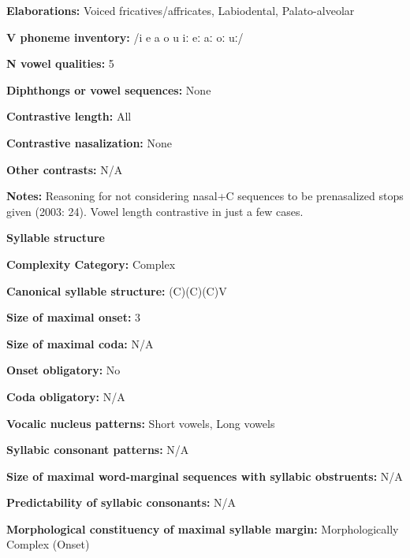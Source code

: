 \textbf{Elaborations:} Voiced fricatives/affricates, Labiodental, Palato-alveolar



\textbf{V phoneme inventory:} /i e a o u iː eː aː oː uː/



\textbf{N vowel qualities:} 5



\textbf{Diphthongs or vowel sequences:} None



\textbf{Contrastive length:} All



\textbf{Contrastive nasalization:} None



\textbf{Other contrasts:} N/A



\textbf{Notes:} Reasoning for not considering nasal+C sequences to be prenasalized stops given (2003: 24). Vowel length contrastive in just a few cases.



\textbf{Syllable structure}



\textbf{Complexity Category:} Complex



\textbf{Canonical syllable structure:} (C)(C)(C)V \citep[20-21]{Kawasha2003}



\textbf{Size of maximal onset:} 3



\textbf{Size of maximal coda:} N/A



\textbf{Onset obligatory:} No



\textbf{Coda obligatory:} N/A



\textbf{Vocalic nucleus patterns:} Short vowels, Long vowels



\textbf{Syllabic consonant patterns:} N/A



\textbf{Size of maximal word{}-marginal sequences with syllabic obstruents:} N/A



\textbf{Predictability of syllabic consonants:} N/A



\textbf{Morphological constituency of maximal syllable margin:} Morphologically Complex (Onset)



